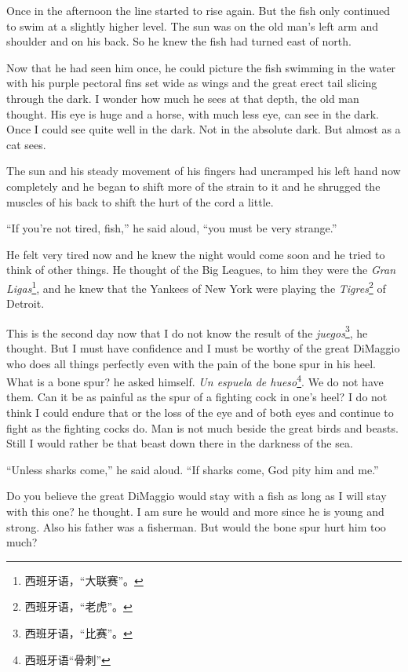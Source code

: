 \documentclass[fontset=ubuntu]{ctexrep}
\begin{document}
Once in the afternoon the line started to rise again. But the fish only
continued to swim at a \gls{slightly} higher level. The sun was on the old
man's left arm and shoulder and on his back. So he knew the fish had turned
east of north.

Now that he had seen him once, he could picture the fish swimming in the
water with his purple pectoral fins set wide as wings and the great
\gls{erect} tail \gls{slicing} through the dark. I wonder how much he sees
at that depth, the old man thought. His eye is huge and a horse, with much
less eye, can see in the dark. Once I could see quite well in the dark. Not
in the \gls{absolute} dark. But almost as a cat sees.

The sun and his steady movement of his fingers had uncramped his left hand
now completely and he began to shift more of the strain to it and he
\gls{shrugged} the muscles of his back to shift the hurt of the cord a little.

``If you're not tired, fish,'' he said aloud, ``you must be very strange.''

He felt very tired now and he knew the night would come soon and he tried to
think of other things. He thought of the Big Leagues, to him they were the
\emph{Gran Ligas}\footnote{西班牙语，“大联赛”。}, and he knew that the
Yankees of New York were playing the \emph{Tigres}\footnote{西班牙语，“老虎”。} of Detroit.

This is the second day now that I do not know the result of the
\emph{juegos}\footnote{西班牙语，“比赛”。}, he thought. But I must have confidence
and I must be worthy of the great DiMaggio who does all things perfectly
even with the pain of the bone \gls{spur} in his \gls{heel}. What is a bone
spur? he asked himself. \emph{Un espuela de hueso}\footnote{西班牙语“骨刺”}. We
do not have them. Can it be as painful as the spur of a fighting cock in
one's heel? I do not think I could endure that or the loss of the eye and of
both eyes and continue to fight as the fighting cocks do. Man is not much
\gls{beside} the great birds and \glspl{beast}. Still I would rather be that
beast down there in the darkness of the sea.

``Unless sharks come,'' he said aloud. ``If sharks come, God pity him and me.''

Do you believe the great DiMaggio would stay with a fish as long as I will
stay with this one? he thought. I am sure he would and more since he is
young and strong. Also his father was a fisherman. But would the bone spur
hurt him too much?
\end{document}
